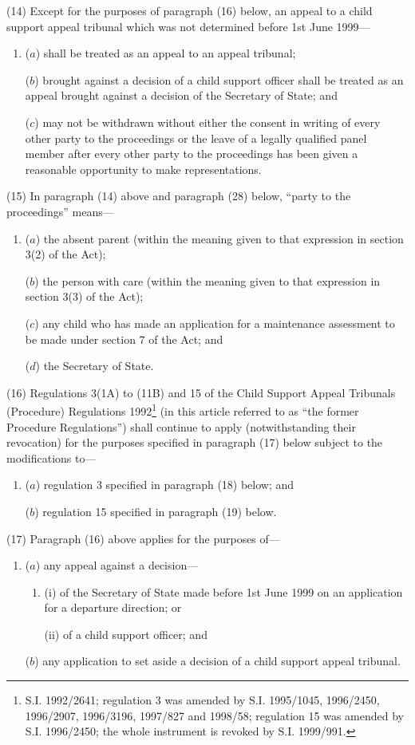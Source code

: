 \documentclass[12pt,a4paper]{article}
\begin{document}
(14) Except for the purposes of paragraph (16) below, an appeal to a child support appeal tribunal which was not determined before 1st June 1999—
\begin{enumerate}\item[]
($a$) shall be treated as an appeal to an appeal tribunal;

($b$) brought against a decision of a child support officer shall be treated as an appeal brought against a decision of the Secretary of State; and

($c$) may not be withdrawn without either the consent in writing of every other party to the proceedings or the leave of a legally qualified panel member after every other party to the proceedings has been given a reasonable opportunity to make representations.
\end{enumerate}

(15) In paragraph (14) above and paragraph (28) below, “party to the proceedings” means—
\begin{enumerate}\item[]
($a$) the absent parent (within the meaning given to that expression in section 3(2) of the Act);

($b$) the person with care (within the meaning given to that expression in section 3(3) of the Act);

($c$) any child who has made an application for a maintenance assessment to be made under section 7 of the Act; and

($d$) the Secretary of State.
\end{enumerate}

(16) Regulations 3(1A) to (11B) and 15 of the Child Support Appeal Tribunals (Procedure) Regulations 1992\footnote{\frenchspacing S.I. 1992/2641; regulation 3 was amended by S.I. 1995/1045, 1996/2450, 1996/2907, 1996/3196, 1997/827 and 1998/58; regulation 15 was amended by S.I. 1996/2450; the whole instrument is revoked by S.I. 1999/991.} (in this article referred to as “the former Procedure Regulations”) shall continue to apply (notwithstanding their revocation) for the purposes specified in paragraph (17) below subject to the modifications to—
\begin{enumerate}\item[]
($a$) regulation 3 specified in paragraph (18) below; and

($b$) regulation 15 specified in paragraph (19) below.
\end{enumerate}

(17) Paragraph (16) above applies for the purposes of—
\begin{enumerate}\item[]
($a$) any appeal against a decision—
\begin{enumerate}\item[]
(i) of the Secretary of State made before 1st June 1999 on an application for a departure direction; or

(ii) of a child support officer; and
\end{enumerate}

($b$) any application to set aside a decision of a child support appeal tribunal.
\end{enumerate}
\end{document}
